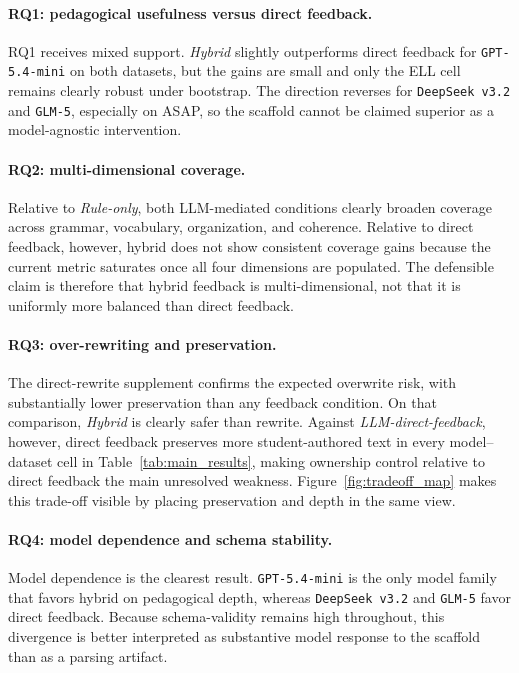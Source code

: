 \documentclass[preprint,12pt]{elsarticle}
\begin{document}
\paragraph{RQ1: pedagogical usefulness versus direct feedback.}
RQ1 receives mixed support. \textit{Hybrid} slightly outperforms direct feedback for \texttt{GPT-5.4-mini} on both datasets, but the gains are small and only the ELL cell remains clearly robust under bootstrap. The direction reverses for \texttt{DeepSeek v3.2} and \texttt{GLM-5}, especially on ASAP, so the scaffold cannot be claimed superior as a model-agnostic intervention.

\paragraph{RQ2: multi-dimensional coverage.}
Relative to \textit{Rule-only}, both LLM-mediated conditions clearly broaden coverage across grammar, vocabulary, organization, and coherence. Relative to direct feedback, however, hybrid does not show consistent coverage gains because the current metric saturates once all four dimensions are populated. The defensible claim is therefore that hybrid feedback is multi-dimensional, not that it is uniformly more balanced than direct feedback.

\paragraph{RQ3: over-rewriting and preservation.}
The direct-rewrite supplement confirms the expected overwrite risk, with substantially lower preservation than any feedback condition. On that comparison, \textit{Hybrid} is clearly safer than rewrite. Against \textit{LLM-direct-feedback}, however, direct feedback preserves more student-authored text in every model--dataset cell in Table~\ref{tab:main_results}, making ownership control relative to direct feedback the main unresolved weakness. Figure~\ref{fig:tradeoff_map} makes this trade-off visible by placing preservation and depth in the same view.

\paragraph{RQ4: model dependence and schema stability.}
Model dependence is the clearest result. \texttt{GPT-5.4-mini} is the only model family that favors hybrid on pedagogical depth, whereas \texttt{DeepSeek v3.2} and \texttt{GLM-5} favor direct feedback. Because schema-validity remains high throughout, this divergence is better interpreted as substantive model response to the scaffold than as a parsing artifact.
\end{document}
